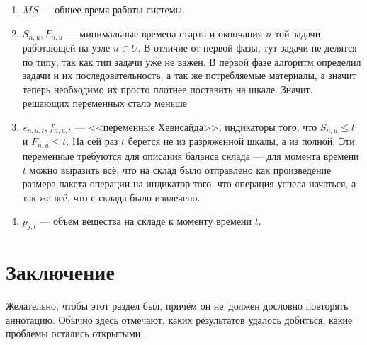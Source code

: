 \documentclass[12pt, twoside]{article}
\theoremstyle{definition}
\begin{document}
\begin{enumerate}

\item $MS$ --- общее время работы системы.
\item $S_{n, u}, F_{n, u}$ --- минимальные времена старта и окончания $n$-той задачи, работающей на узле $u \in U$. В отличие от первой фазы, тут задачи не делятся по типу, так как тип задачи уже не важен. В первой фазе алгоритм определил задачи и их последовательность, а так же потребляемые материалы, а значит теперь необходимо их просто плотнее поставить на шкале. Значит, решающих переменных стало меньше
\item $s_{n, u, t}, f_{n, u, t}$ --- <<переменные Хевисайда>>, индикаторы того, что $S_{n, u} \leq t$ и $F_{n, u} \leq t$. На сей раз $t$ берется не из разряженной шкалы, а из полной. Эти переменные требуются для описания баланса склада --- для момента времени $t$ можно выразить всё, что на склад было отправлено как произведение размера пакета операции на индикатор того, что операция успела начаться, а так же всё, что с склада было извлечено.
\item $p_{j, t}$ --- объем вещества на складе к моменту времени $t$.

\end{enumerate}

\section{Заключение}
Желательно, чтобы этот раздел был, причём он не~должен дословно повторять аннотацию.
Обычно здесь отмечают, каких результатов удалось добиться, какие проблемы остались открытыми.
\end{document}
